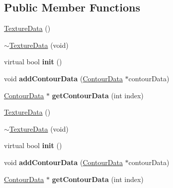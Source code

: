 \subsection*{Public Member Functions}
\begin{DoxyCompactItemize}
\item 
\hyperlink{classcocostudio_1_1TextureData_af00880550553adf09052ae862411c9f3}{Texture\+Data} ()
\item 
\hyperlink{classcocostudio_1_1TextureData_a5d9a6888d3afac5e9fcd14b5879647fc}{$\sim$\+Texture\+Data} (void)
\item 
\mbox{\label{classcocostudio_1_1TextureData_af651fca6b8e558a4d5988a41f1db3701}} 
virtual bool {\bfseries init} ()
\item 
\mbox{\label{classcocostudio_1_1TextureData_afd8802f458171a5dd66a131446ffa947}} 
void {\bfseries add\+Contour\+Data} (\hyperlink{classcocostudio_1_1ContourData}{Contour\+Data} $\ast$contour\+Data)
\item 
\mbox{\label{classcocostudio_1_1TextureData_a99f7886a0003206727848d494b38e681}} 
\hyperlink{classcocostudio_1_1ContourData}{Contour\+Data} $\ast$ {\bfseries get\+Contour\+Data} (int index)
\item 
\hyperlink{classcocostudio_1_1TextureData_af00880550553adf09052ae862411c9f3}{Texture\+Data} ()
\item 
\hyperlink{classcocostudio_1_1TextureData_a5d9a6888d3afac5e9fcd14b5879647fc}{$\sim$\+Texture\+Data} (void)
\item 
\mbox{\label{classcocostudio_1_1TextureData_af807f099e60af06a61312311da041d2b}} 
virtual bool {\bfseries init} ()
\item 
\mbox{\label{classcocostudio_1_1TextureData_afd8802f458171a5dd66a131446ffa947}} 
void {\bfseries add\+Contour\+Data} (\hyperlink{classcocostudio_1_1ContourData}{Contour\+Data} $\ast$contour\+Data)
\item 
\mbox{\label{classcocostudio_1_1TextureData_ac45e950692f563046d243bc6416079c2}} 
\hyperlink{classcocostudio_1_1ContourData}{Contour\+Data} $\ast$ {\bfseries get\+Contour\+Data} (int index)
\end{DoxyCompactItemize}
